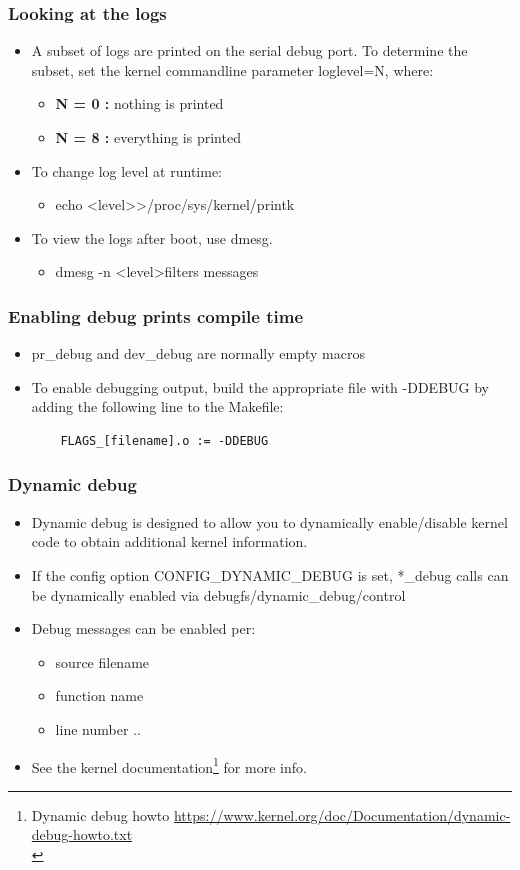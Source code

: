 \documentclass{beamer}
\begin{document}
\begin{frame}
\frametitle{Looking at the logs}
\begin{itemize}
	\item A subset of logs are printed on the serial debug port. To determine the subset, set the kernel commandline parameter loglevel=N, where:
	\begin{itemize}	
		\item \textbf{N = 0 :} nothing is printed
		\item \textbf{N = 8 :} everything is printed
	\end{itemize}
	\item To change log level at runtime:
	\begin{itemize}
		\item	echo  \textless level\textgreater \space \textgreater \space /proc/sys/kernel/printk
	\end{itemize}
	\item To view the logs after boot, use dmesg.
	\begin{itemize}
		\item dmesg -n \textless level\textgreater \space filters messages
	\end{itemize}
\end{itemize}

\end{frame}

\begin{frame}[fragile]
\frametitle{Enabling debug prints compile time}
\begin{itemize}
	\item pr\_debug and dev\_debug are normally empty macros
	\item To enable debugging output, build the appropriate file with -DDEBUG by adding the following line to the Makefile:
	\begin{verbatim}
	FLAGS_[filename].o := -DDEBUG
	\end{verbatim}
\end{itemize}
\end{frame}

\begin{frame}
\frametitle{Dynamic debug}
\begin{itemize}
	\item Dynamic debug is designed to allow you to dynamically enable/disable kernel code to obtain additional kernel information.
	\item If the config option CONFIG\_DYNAMIC\_DEBUG is set, *\_debug calls can be dynamically enabled via debugfs/dynamic\_debug/control
	\item Debug messages can be enabled per:
	\begin{itemize}
		\item source filename
		\item function name
		\item line number ..
	\end{itemize}
	\item See the kernel documentation\footnote{Dynamic debug howto \url{https://www.kernel.org/doc/Documentation/dynamic-debug-howto.txt} \\} for more info.
\end{itemize}
\end{frame}
\end{document}
